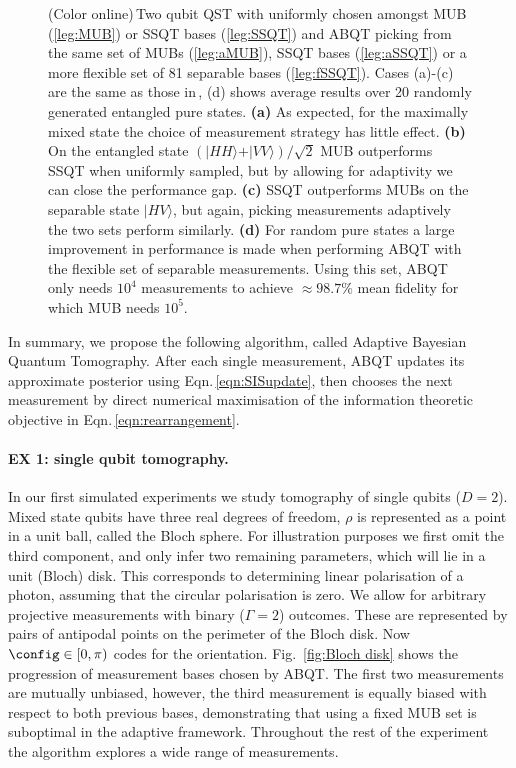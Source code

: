 \begin{figure*}[th]
\figthree
\caption{(Color online)\,Two qubit QST with uniformly chosen amongst MUB (\ref{leg:MUB}) or SSQT bases (\ref{leg:SSQT}) and ABQT picking from the same set of MUBs (\ref{leg:aMUB}),  SSQT bases (\ref{leg:aSSQT}) or a more flexible set of 81 separable bases (\ref{leg:fSSQT}). Cases (a)-(c) are the same as those in\,\cite{MUBExperiment}, (d) shows average results over 20 randomly generated entangled pure states. \textbf{(a)} As expected, for the maximally mixed state the choice of measurement strategy has little effect. \textbf{(b)} On the entangled state $(\vert HH\rangle+\vert VV\rangle)/\sqrt{2}$ MUB outperforms SSQT when uniformly sampled, but by allowing for adaptivity we can close the performance gap. \textbf{(c)} SSQT outperforms MUBs on the separable state $\vert HV \rangle$, but again, picking measurements adaptively the two sets perform similarly. \textbf{(d)} For random pure states a large improvement in performance is made when performing ABQT with the flexible set of separable measurements. Using this set, ABQT only needs $10^4$ measurements to achieve $\approx98.7\%$ mean fidelity for which MUB needs $10^5$.\label{fig:two_qubit_results}}
\end{figure*}

In summary, we propose the following algorithm, called Adaptive Bayesian Quantum Tomography. After each single measurement, ABQT updates its approximate posterior using Eqn.\,\eqref{eqn:SISupdate}, then chooses the next measurement by direct numerical maximisation of the information theoretic objective in Eqn.\,\eqref{eqn:rearrangement}.

\paragraph{EX 1: single qubit tomography.} In our first simulated experiments we study tomography of single qubits ($D=2$). Mixed state qubits have three real degrees of freedom, $\rho$ is represented as a point in a unit ball, called the Bloch sphere. For illustration purposes we first omit the third component, and only infer two remaining parameters, which will lie in a unit (Bloch) disk. This corresponds to \eg determining linear polarisation of a photon, assuming that the circular polarisation is zero. We allow for arbitrary projective measurements with binary ($\Gamma = 2$) outcomes. These are represented by pairs of antipodal points on the perimeter of the Bloch disk. Now $\config\in[0,\pi)$ codes for the orientation. Fig.\ \ref{fig:Bloch disk} shows the progression of measurement bases chosen by ABQT. The first two measurements are mutually unbiased, however, the third measurement is equally biased with respect to both previous bases, demonstrating that using a fixed MUB set is suboptimal in the adaptive framework. Throughout the rest of the experiment the algorithm explores a wide range of measurements.

